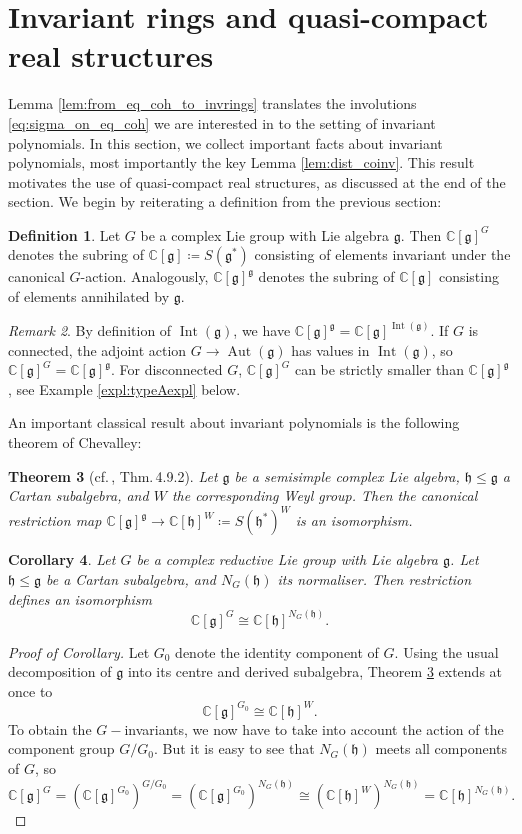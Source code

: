 \documentclass{amsart}
\newcommand{\cf}{cf.\,}
\newcommand{\Aut}{\operatorname{Aut}}
\newcommand{\C}{\mathbb{C}}
\newcommand{\g}{\mathfrak{g}}
\newcommand{\h}{\mathfrak{h}}
\newcommand{\Int}{\operatorname{Int}}
\theoremstyle{definition}
\newtheorem{defn}{Definition}[section]
\theoremstyle{plain}
\newtheorem{thm}[defn]{Theorem}
\newtheorem{cor}[defn]{Corollary}
\theoremstyle{remark}
\newtheorem{rmk}[defn]{Remark}
\begin{document}
\section{Invariant rings and quasi-compact real structures}
\label{sec:invrings_and_qcrs}
Lemma \ref{lem:from_eq_coh_to_invrings} translates the involutions \eqref{eq:sigma_on_eq_coh} we are interested in to the setting of invariant polynomials. In this section, we collect important facts about invariant polynomials, most importantly the key Lemma \ref{lem:dist_coinv}. This result motivates the use of quasi-compact real structures, as discussed at the end of the section. We begin by reiterating a definition from the previous section:
\begin{defn}
    Let $G$ be a complex Lie group with Lie algebra $\g$. Then $\C[\g]^G$ denotes the subring of $\C[\g] \coloneqq S(\g^*)$ consisting of elements invariant under the canonical $G$-action. Analogously, $\C[\g]^\g$ denotes the subring of $\C[\g]$ consisting of elements annihilated by $\g$.
\end{defn}
\begin{rmk}
    By definition of $\Int(\g)$, we have $\C[\g]^\g = \C[\g]^{\Int(\g)}$. If $G$ is connected, the adjoint action $G\to \Aut(\g)$ has values in $\Int(\g)$, so $\C[\g]^G = \C[\g]^\g$. For disconnected $G$, $\C[\g]^G$ can be strictly smaller than $\C[\g]^\g$, see Example \ref{expl:typeAexpl} below.
\end{rmk}

An important classical result about invariant polynomials is the following theorem of Chevalley:
\begin{thm}[\cf\cite{Varadarajan_Lie}, Thm.\,4.9.2]
\label{thm:CRT}
    Let $\g$ be a semisimple complex Lie algebra, $\h\le \g$ a Cartan subalgebra, and $W$ the corresponding Weyl group. Then the canonical restriction map $\C[\g]^\g\to \C[\h]^W \coloneqq S(\h^*)^W$ is an isomorphism.
\end{thm}
\begin{cor}
\label{cor:crt_extended}
    Let $G$ be a complex reductive Lie group with Lie algebra $\g$. Let $\h\le \g$ be a Cartan subalgebra, and $N_G(\h)$ its normaliser. Then restriction defines an isomorphism
    $$
        \C[\g]^G \cong \C[\h]^{N_G(\h)}.
    $$
\end{cor}
\begin{proof}[Proof of Corollary]
    Let $G_0$ denote the identity component of $G$. Using the usual decomposition of $\g$ into its centre and derived subalgebra, Theorem \ref{thm:CRT} extends at once to
    $$
        \C[\g]^{G_0} \cong \C[\h]^W.
    $$
    To obtain the $G-$invariants, we now have to take into account the action of the component group $G/G_0$. But it is easy to see that $N_G(\h)$ meets all components of $G$, so
    $$
        \C[\g]^G
        =
        (\C[\g]^{G_0})^{G/G_0}
        =
        (\C[\g]^{G_0})^{N_G(\h)}
        \cong
        (\C[\h]^W)^{N_G(\h)}
        =
        \C[\h]^{N_G(\h)}.
    $$
\end{proof}
\end{document}
